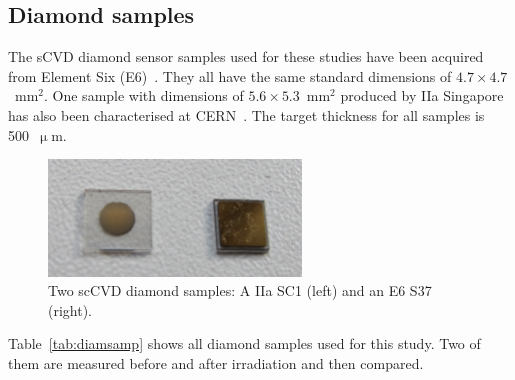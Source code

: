\subsection{Diamond samples}
\label{sec:diamsam}
The sCVD diamond sensor samples used for these studies have been acquired from Element Six (E6)~\cite{E6:00000}. They all have the same standard dimensions of $4.7\times4.7$~mm$^2$. %
One sample with dimensions of $5.6\times5.3$~mm$^2$ produced by IIa Singapore~\cite{IIA:00000} has also been characterised at CERN~\cite{IIa:00001}. The target thickness for all samples is 500~$\upmu$m. %
\begin{figure}
\centering
\includegraphics[width=0.6\textwidth]{03_measurement_results/pics/setup/diamond4}
\caption{Two scCVD diamond samples: A IIa SC1 (left) and an E6 S37 (right).}
\label{fig:diams}
\end{figure}
Table~\ref{tab:diamsamp} shows all diamond samples used for this study. Two of them are measured before and after irradiation and then compared. %

